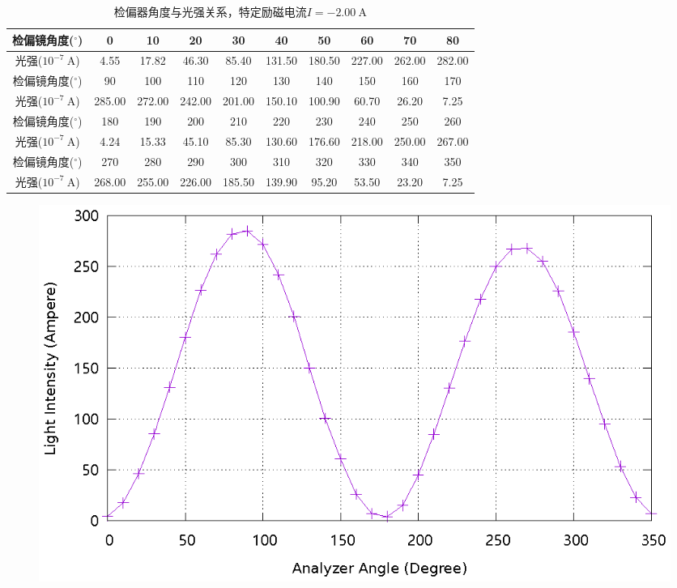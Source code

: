 \documentclass{ctexart}
\newcommand{\si}[1]{\  \mathrm{#1}}
\begin{document}
\begin{table}[H]
    \centering
    \begin{tabular}{|c|c|c|c|c|c|c|c|c|c|}
        \hline
        检偏镜角度(${}^{\circ}$)  & 0   & 10  & 20  & 30  & 40  & 50  & 60  & 70  & 80  \\\hline
        光强($10^{-7} \si{A}$) & 4.55 & 17.82 & 46.30 & 85.40 & 131.50 & 180.50 & 227.00 & 262.00 & 282.00 \\\hline
        检偏镜角度(${}^{\circ}$)  & 90  & 100 & 110 & 120 & 130 & 140 & 150 & 160 & 170 \\\hline
        光强($10^{-7} \si{A}$) & 285.00 & 272.00 & 242.00 & 201.00 & 150.10 & 100.90 & 60.70 & 26.20 & 7.25 \\\hline
        检偏镜角度(${}^{\circ}$)  & 180 & 190 & 200 & 210 & 220 & 230 & 240 & 250 & 260 \\\hline
        光强($10^{-7} \si{A}$) & 4.24 & 15.33 & 45.10 & 85.30 & 130.60 & 176.60 & 218.00 & 250.00 & 267.00 \\\hline
        检偏镜角度(${}^{\circ}$)  & 270 & 280 & 290 & 300 & 310 & 320 & 330 & 340 & 350 \\\hline
        光强($10^{-7} \si{A}$) & 268.00 & 255.00 & 226.00 & 185.50 & 139.90 & 95.20 & 53.50 & 23.20 & 7.25 \\\hline
    \end{tabular}
    \caption{检偏器角度与光强关系，特定励磁电流$I=-2.00 \si{A}$}
\end{table}
\begin{figure}[H]
    \centering
    \includegraphics[width=0.9\linewidth]{../output/analyzer-angle-light-intensity-4.gnuplot}
\end{figure}
\newpage
\end{document}
